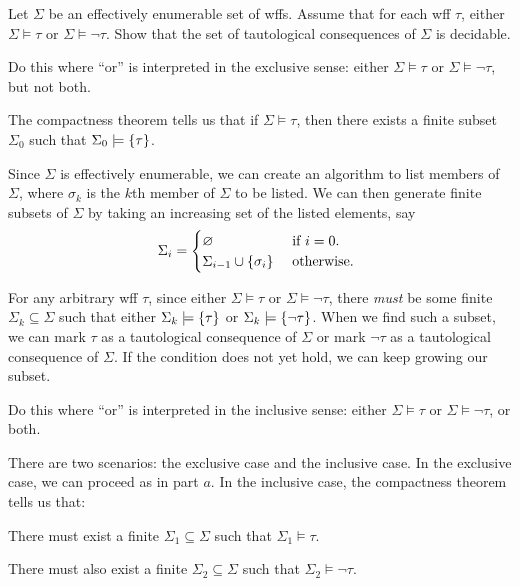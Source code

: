 \begin{problem}
  Let $\Sigma$ be an effectively enumerable set of wffs.
  Assume that for each wff $\tau$, either $\Sigma \models \tau$
  or $\Sigma \models \lnot \tau$.
  Show that the set of tautological consequences of $\Sigma$ is decidable.
  \begin{enumalph}
    \item Do this where ``or'' is interpreted in the exclusive sense:
      either $\Sigma \models \tau$ or $\Sigma \models \lnot \tau$,
      but not both.
      \begin{Answer}
        The compactness theorem tells us that if $\Sigma \models \tau$,
        then there exists a finite subset $\Sigma_0$ such that $\Sigma_0 \models \left\{\tau\right\}$.
        
        \step
        Since $\Sigma$ is effectively enumerable,
        we can create an algorithm to list members of $\Sigma$,
        where $\sigma_k$ is the $k$th member of $\Sigma$ to be listed.
        We can then generate finite subsets of $\Sigma$ by taking an increasing set of the listed elements,
        say \[
          \Sigma_i = \begin{cases}
            \varnothing& \text{ if $i = 0$. }\\
            \Sigma_{i-1} \cup \left\{\sigma_i\right\} &\text{ otherwise. }
          \end{cases}
        \]

        \step
        For any arbitrary wff $\tau$, since either $\Sigma \models \tau$ or $\Sigma \models \lnot \tau$,
        there \emph{must} be some finite $\Sigma_k \subseteq \Sigma$ such that either $\Sigma_k \models \left\{\tau\right\}$
        or $\Sigma_k \models \left\{\lnot \tau\right\}$.
        When we find such a subset, we can mark $\tau$ as a tautological consequence of $\Sigma$
        or mark $\lnot \tau$ as a tautological consequence of $\Sigma$.
        If the condition does not yet hold, we can keep growing our subset.
      \end{Answer}
    \item Do this where ``or'' is interpreted in the inclusive sense:
      either $\Sigma \models \tau$ or $\Sigma \models \lnot \tau$,
      or both.
      \begin{Answer}
        There are two scenarios: the exclusive case and the inclusive case.
        In the exclusive case, we can proceed as in part $a$.
        In the inclusive case, the compactness theorem tells us that:
        \begin{enumroman}
          \item There must exist a finite $\Sigma_1 \subseteq \Sigma$ such that $\Sigma_1 \models \tau$.
          \item There must also exist a finite $\Sigma_2 \subseteq \Sigma$ such that $\Sigma_2 \models \lnot \tau$.
        \end{enumroman}


\end{Answer}
\end{enumalph}
\end{problem}
